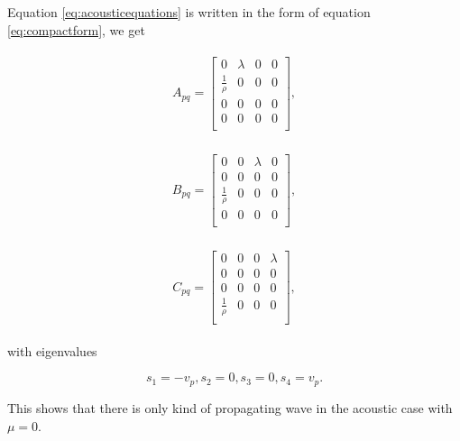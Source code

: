 Equation \ref{eq:acousticequations} is written in the form of equation \ref{eq:compactform}, we get 

\begin{align}
    \begin{split}
    A_{pq} = 
        \begin{bmatrix}
            0 & \lambda & 0 & 0 \\
            \frac{1}{\rho} & 0 & 0 & 0 \\
            0 & 0 & 0 & 0 \\
            0 & 0 & 0 & 0 \\
    \end{bmatrix},
    \end{split}
\end{align}

\begin{align}
    \begin{split}
    B_{pq} = 
        \begin{bmatrix}
            0 & 0 & \lambda & 0 \\
            0 & 0 & 0 & 0 \\
            \frac{1}{\rho} & 0 & 0 & 0\\
            0 & 0 & 0 & 0 \\
    \end{bmatrix},
    \end{split}
\end{align}

\begin{align}
    \begin{split}
    C_{pq} = 
        \begin{bmatrix}
            0 & 0 & 0 & \lambda \\
            0 & 0 & 0 & 0 \\
            0 & 0 & 0 & 0 \\
            \frac{1}{\rho} & 0 & 0 & 0 \\
    \end{bmatrix},
    \end{split}
\end{align}

with eigenvalues

\begin{equation}
    s_1 = -v_p, s_2 = 0, s_3 = 0, s_4 = v_p.
\end{equation}

This shows that there is only kind of propagating wave in the acoustic case with $\mu = 0$. \\

